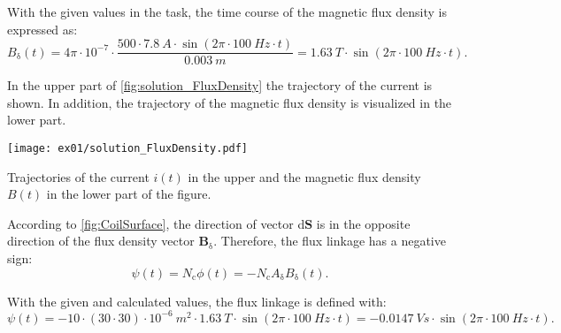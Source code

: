 \begin{solutionblock}
    With the given values in the task, the time course of the magnetic flux density is expressed as:
    \begin{equation}
        B_{\mathrm{\updelta}}(t) = 4 \pi \cdot 10^{-7} \cdot \frac{500 \cdot 7.8 \ \si{A} \cdot \sin(2 \pi \cdot 100 \ \si{Hz} \cdot t)}{0.003 \ \si{m}}
        = 1.63 \ \si{T} \cdot \sin(2 \pi \cdot 100 \ \si{Hz} \cdot t).
    \end{equation}

    In the upper part of \autoref{fig:solution_FluxDensity} the trajectory of the current is shown. In addition, the trajectory of the magnetic flux density is visualized in the lower part.
    \begin{solutionfigure}[ht]
        \centering
        \texttt{[image: ex01/solution\_FluxDensity.pdf]}
        \caption{Trajectories of the current $i(t)$ in the upper and the magnetic flux density $B(t)$ in the lower part of the figure.}
        \label{fig:solution_FluxDensity}
    \end{solutionfigure}

\end{solutionblock}




\begin{solutionblock}

    According to \autoref{fig:CoilSurface}, the direction of vector d$\boldsymbol{S}$ is in the opposite direction of the flux density vector $\boldsymbol{{B}}_{\updelta}$. Therefore, the flux linkage has a negative sign:
    \begin{equation}
        \psi(t) = N_{\mathrm{c}} \phi(t)
        = - N_{\mathrm{c}} A_{\mathrm{\updelta}} B_{\mathrm{\updelta}}(t).
    \end{equation}

    With the given and calculated values, the flux linkage is defined with:
    \begin{equation}
        \psi(t) = -10 \cdot (30 \cdot 30) \cdot 10^{-6} \ \si{m^2} \cdot 1.63 \ \si{T} \cdot \sin(2 \pi  \cdot 100 \ \si{Hz} \cdot t)
        = -0.0147 \ \si{Vs} \cdot \sin(2 \pi \cdot 100 \ \si{Hz} \cdot t).
    \end{equation}

\end{solutionblock}



